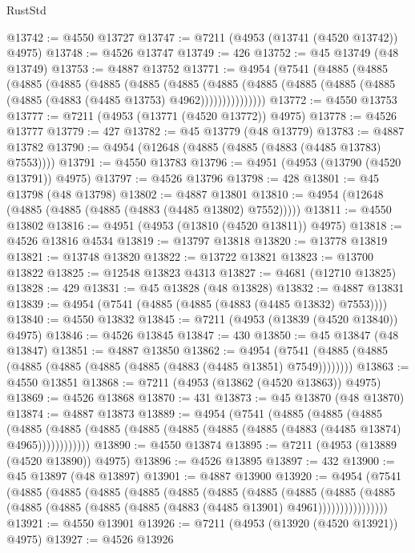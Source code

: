 \begin{lexlean}{RustStd}
\begin{coremodule}
@13742 := @4550 @13727
@13747 := @7211 (@4953 (@13741 (@4520 @13742)) @4975)
@13748 := @4526 @13747
@13749 := 426
@13752 := @45 @13749 (@48 @13749)
@13753 := @4887 @13752
@13771 := @4954
    (@7541
      (@4885
        (@4885
          (@4885
            (@4885
              (@4885
                (@4885
                  (@4885
                    (@4885
                      (@4885 (@4885 (@4885 (@4885 (@4885 (@4883 (@4485 @13753) @4962)))))))))))))))
@13772 := @4550 @13753
@13777 := @7211 (@4953 (@13771 (@4520 @13772)) @4975)
@13778 := @4526 @13777
@13779 := 427
@13782 := @45 @13779 (@48 @13779)
@13783 := @4887 @13782
@13790 := @4954 (@12648 (@4885 (@4885 (@4883 (@4485 @13783) @7553))))
@13791 := @4550 @13783
@13796 := @4951 (@4953 (@13790 (@4520 @13791)) @4975)
@13797 := @4526 @13796
@13798 := 428
@13801 := @45 @13798 (@48 @13798)
@13802 := @4887 @13801
@13810 := @4954 (@12648 (@4885 (@4885 (@4885 (@4883 (@4485 @13802) @7552)))))
@13811 := @4550 @13802
@13816 := @4951 (@4953 (@13810 (@4520 @13811)) @4975)
@13818 := @4526 @13816 @4534
@13819 := @13797 @13818
@13820 := @13778 @13819
@13821 := @13748 @13820
@13822 := @13722 @13821
@13823 := @13700 @13822
@13825 := @12548 @13823 @4313
@13827 := @4681 (@12710 @13825)
@13828 := 429
@13831 := @45 @13828 (@48 @13828)
@13832 := @4887 @13831
@13839 := @4954 (@7541 (@4885 (@4885 (@4883 (@4485 @13832) @7553))))
@13840 := @4550 @13832
@13845 := @7211 (@4953 (@13839 (@4520 @13840)) @4975)
@13846 := @4526 @13845
@13847 := 430
@13850 := @45 @13847 (@48 @13847)
@13851 := @4887 @13850
@13862 := @4954 (@7541 (@4885 (@4885 (@4885 (@4885 (@4885 (@4885 (@4883 (@4485 @13851) @7549))))))))
@13863 := @4550 @13851
@13868 := @7211 (@4953 (@13862 (@4520 @13863)) @4975)
@13869 := @4526 @13868
@13870 := 431
@13873 := @45 @13870 (@48 @13870)
@13874 := @4887 @13873
@13889 := @4954
    (@7541
      (@4885
        (@4885
          (@4885
            (@4885 (@4885 (@4885 (@4885 (@4885 (@4885 (@4885 (@4883 (@4485 @13874) @4965))))))))))))
@13890 := @4550 @13874
@13895 := @7211 (@4953 (@13889 (@4520 @13890)) @4975)
@13896 := @4526 @13895
@13897 := 432
@13900 := @45 @13897 (@48 @13897)
@13901 := @4887 @13900
@13920 := @4954
    (@7541
      (@4885
        (@4885
          (@4885
            (@4885
              (@4885
                (@4885
                  (@4885
                    (@4885
                      (@4885
                        (@4885
                          (@4885 (@4885 (@4885 (@4885 (@4883 (@4485 @13901) @4961))))))))))))))))
@13921 := @4550 @13901
@13926 := @7211 (@4953 (@13920 (@4520 @13921)) @4975)
@13927 := @4526 @13926

\end{coremodule}
\end{lexlean}
